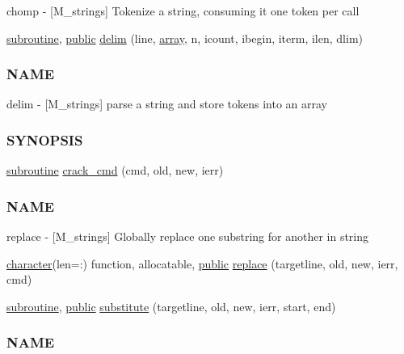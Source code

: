 \begin{DoxyCompactItemize}
\begin{DoxyCompactList}
chomp -\/ \mbox{[}M\+\_\+strings\mbox{]} Tokenize a string, consuming it one token per call \end{DoxyCompactList}\item 
\hyperlink{M__stopwatch_83_8txt_acfbcff50169d691ff02d4a123ed70482}{subroutine}, \hyperlink{M__stopwatch_83_8txt_a2f74811300c361e53b430611a7d1769f}{public} \hyperlink{namespacem__strings_a9890da826d63d6f04367887007611cb5}{delim} (line, \hyperlink{intro__blas1_83_8txt_a89db1945e1a335ab0184c6a097821e32}{array}, n, icount, ibegin, iterm, ilen, dlim)
\begin{DoxyCompactList}\small\item\em \subsubsection*{N\+A\+ME}

delim -\/ \mbox{[}M\+\_\+strings\mbox{]} parse a string and store tokens into an array \subsubsection*{S\+Y\+N\+O\+P\+S\+IS}\end{DoxyCompactList}\item 
\hyperlink{M__stopwatch_83_8txt_acfbcff50169d691ff02d4a123ed70482}{subroutine} \hyperlink{namespacem__strings_a818d715927dd61c1be6df5d2cdec4e4c}{crack\+\_\+cmd} (cmd, old, new, ierr)
\begin{DoxyCompactList}\small\item\em \subsubsection*{N\+A\+ME}

replace -\/ \mbox{[}M\+\_\+strings\mbox{]} Globally replace one substring for another in string \end{DoxyCompactList}\item 
\hyperlink{option__stopwatch_83_8txt_abd4b21fbbd175834027b5224bfe97e66}{character}(len=\+:) function, allocatable, \hyperlink{M__stopwatch_83_8txt_a2f74811300c361e53b430611a7d1769f}{public} \hyperlink{namespacem__strings_a02d97675e95b9bd0ef3fd2abb9f2f435}{replace} (targetline, old, new, ierr, cmd)
\item 
\hyperlink{M__stopwatch_83_8txt_acfbcff50169d691ff02d4a123ed70482}{subroutine}, \hyperlink{M__stopwatch_83_8txt_a2f74811300c361e53b430611a7d1769f}{public} \hyperlink{namespacem__strings_ab84a4b7c2be211433c2d1b435a87fa32}{substitute} (targetline, old, new, ierr, start, end)
\begin{DoxyCompactList}\small\item\em \subsubsection*{N\+A\+ME}


\end{DoxyCompactList}
\end{DoxyCompactItemize}

